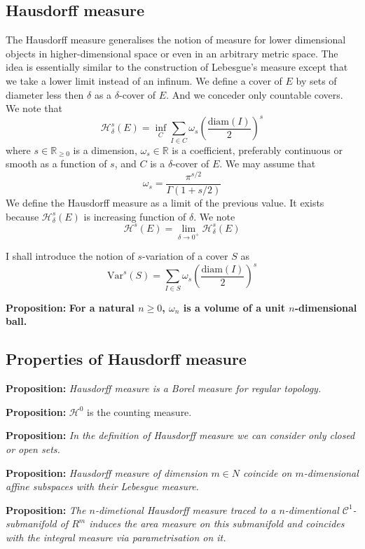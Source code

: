 \documentclass{article}
\begin{document}
\subsection{Hausdorff measure}
The Hausdorff measure generalises the notion of measure for lower dimensional
objects in higher-dimensional space or even in an arbitrary metric space. The
idea is essentially similar to the
construction of Lebesgue's measure except that we take a lower limit instead of
an infinum. We define a cover of $E$ by sets of diameter less then $\delta$ as
a $\delta$-cover of $E$. And we conceder only countable covers. We note that
\[\mathcal{H}_\delta^s(E)=\inf_{C}\sum_{I\in C}\omega_s\left(\frac{\text{diam}(I)}{2}\right)^s\]
where $s\in\mathbb{R}_{\geq 0}$ is a dimension, $\omega_s\in\mathbb{R}$ is a
coefficient, preferably continuous or smooth as a function of $s$, and $C$ is a
$\delta$-cover of $E$. We may assume that
\[\omega_s = \frac{\pi^{s/2}}{\Gamma(1+s/2)}\]
We define the Hausdorff measure as a limit of the previous value. It exists
because $\mathcal{H}_\delta^s(E)$ is increasing function of $\delta$. We note
\[\mathcal{H}^s(E)=\lim_{\delta\rightarrow0^+}\mathcal{H}^s_\delta(E)\]

I shall introduce the notion of $s$-variation of a cover $S$ as
\[\text{Var}^s(S)=\sum_{I\in S}\omega_s\left(\frac{\text{diam}(I)}{2}\right)^s\]

\textbf{Proposition:} \textbf{For a natural $n\geq 0$, $\omega_n$ is a volume of a unit
$n$-dimensional ball.}
\vspace{1ex}

\subsection{Properties of Hausdorff measure}

\textbf{Proposition:} \textit{Hausdorff measure is a Borel measure for regular topology.}

\vspace{2ex}
\textbf{Proposition:} $\mathcal H^0$ is the counting measure.

\vspace{2ex}
\textbf{Proposition:} \textit{In the definition of Hausdorff measure we can consider
only closed or open sets.}

\vspace{2ex}
\textbf{Proposition:} \textit{Hausdorff measure of dimension $m\in N$ coincide on
$m$-dimensional affine subspaces with their Lebesgue measure.}

\vspace{2ex}
\textbf{Proposition:} \textit{The $n$-dimetional Hausdorff measure traced to a
$n$-dimentional $\mathcal{C}^1$-submanifold of $R^m$ induces the area measure
on this submanifold and coincides with the integral measure via parametrisation
on it.}
\end{document}
